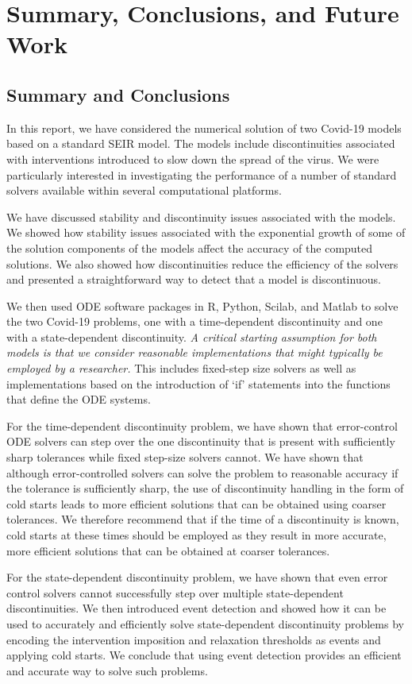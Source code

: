 \section{Summary, Conclusions, and Future Work}
\label{section:summary}
\subsection{Summary and Conclusions}
In this report, we have considered the numerical solution of two Covid-19 models based on a standard SEIR model. The models include discontinuities associated with interventions introduced to slow down the spread of the virus. We were particularly interested in investigating the performance of a number of standard solvers available within several computational platforms.

We have discussed stability and discontinuity issues associated with the models. We showed how stability issues associated with the exponential growth of some of the solution  components of the models affect the accuracy of the computed solutions. We also showed how discontinuities reduce the efficiency of the solvers and presented a straightforward way to detect that a model is discontinuous.

We then used ODE software packages in R, Python, Scilab, and Matlab to solve the two Covid-19 problems, one with a time-dependent discontinuity and one with a state-dependent discontinuity. {\it A critical starting assumption for both models is that we consider reasonable implementations that might typically be employed by a researcher.} This includes fixed-step size solvers as well as implementations based on the introduction of `if' statements into the functions that define the ODE systems. 

For the time-dependent discontinuity problem, we have shown that error-control ODE solvers can step over the one discontinuity that is present with sufficiently sharp tolerances while fixed step-size solvers cannot.  We have shown that although error-controlled solvers can solve the problem to reasonable accuracy if the tolerance is sufficiently sharp, the use of discontinuity handling in the form of cold starts leads to more efficient solutions that can be obtained using coarser tolerances. We therefore recommend that if the time of a discontinuity is known, cold starts at these times should be employed as they result in more accurate, more efficient solutions that can be obtained at coarser tolerances.

For the state-dependent discontinuity problem, we have shown that even error control solvers cannot successfully step over multiple state-dependent discontinuities. We then introduced event detection and showed how it can be used to accurately and efficiently solve state-dependent discontinuity problems by encoding the intervention imposition and relaxation thresholds as events and applying cold starts. We conclude that using event detection provides an efficient and accurate way to solve such problems.

